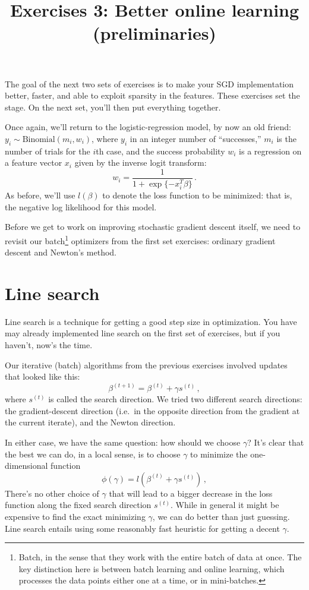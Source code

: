 \documentclass{mynotes}
\title[Exercises 3 $\cdot$ SDS 385]{Exercises 3: Better online learning (preliminaries)}
\date{}  %
\begin{document}
\maketitle%

\bigskip

The goal of the next two sets of exercises is to make your SGD implementation better, faster, and able to exploit sparsity in the features.  These exercises set the stage.  On the next set, you'll then put everything together.

Once again, we'll return to the logistic-regression model, by now an old friend: $y_i \sim \mbox{Binomial}(m_i, w_i)$, where $y_i$ in an integer number of ``successes,'' $m_i$ is the number of trials for the $i$th case, and the success probability $w_i$ is a regression on a feature vector $x_i$ given by the inverse logit transform:
$$
w_i = \frac{1}{1 + \exp\{-x_i^T \beta\}} \, .
$$
As before, we'll use $l(\beta)$ to denote the loss function to be minimized: that is, the negative log likelihood for this model.

Before we get to work on improving stochastic gradient descent itself, we need to revisit our batch\footnote{Batch, in the sense that they work with the entire batch of data at once.  The key distinction here is between batch learning and online learning, which processes the data points either one at a time, or in mini-batches.} optimizers from the first set exercises: ordinary gradient descent and Newton's method.

\section{Line search}

Line search is a technique for getting a good step size in optimization.  You have may already implemented line search on the first set of exercises, but if you haven't, now's the time.

Our iterative (batch) algorithms from the previous exercises involved updates that looked like this:
$$
\beta^{(t+1)} = \beta^{(t)} + \gamma s^{(t)} \, ,
$$
where $s^{(t)}$ is called the search direction.  We tried two different search directions: the gradient-descent direction (i.e.~in the opposite direction from the gradient at the current iterate), and the Newton direction.

In either case, we have the same question: how should we choose $\gamma$?  It's clear that the best we can do, in a local sense, is to choose $\gamma$ to minimize the one-dimensional function
$$
\phi(\gamma) = l(\beta^{(t)} + \gamma s^{(t)}) \, ,
$$
There's no other choice of $\gamma$ that will lead to a bigger decrease in the loss function along the fixed search direction $s^{(t)}$.  While in general it might be expensive to find the exact minimizing $\gamma$, we can do better than just guessing.  Line search entails using some reasonably fast heuristic for getting a decent $\gamma$.
\end{document}
